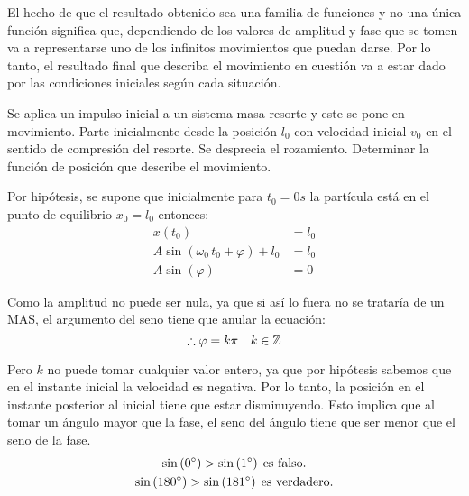 El hecho de que el resultado obtenido sea una familia de funciones y no una única función significa que, dependiendo de los valores de amplitud y fase que se tomen va a representarse uno de los infinitos movimientos que puedan darse.
Por lo tanto, el resultado final que describa el movimiento en cuestión va a estar dado por las condiciones iniciales según cada situación.

\begin{mdframed}[style=ExampleFrame]
    \begin{example}
    \end{example}
    \begin{formatI}
        Se aplica un impulso inicial a un sistema masa-resorte y este se pone en movimiento.
        Parte inicialmente desde la posición $l_0$ con velocidad inicial $v_0$ en el sentido de compresión del resorte.
        Se desprecia el rozamiento.
        Determinar la función de posición que describe el movimiento.
    \end{formatI}
    
    Por hipótesis, se supone que inicialmente para $t_0 = 0s$ la partícula está en el punto de equilibrio $x_0 = l_0$ entonces:
    \begin{align*}
        x(t_0) &= l_0
        \\
        A \sin{(\omega_0 \, t_0 + \varphi)} + l_0 &= l_0
        \\
        A \sin{(\varphi)} &= 0
    \end{align*}
    
    Como la amplitud no puede ser nula, ya que si así lo fuera no se trataría de un MAS, el argumento del seno tiene que anular la ecuación:
    \[ \therefore \varphi = k \pi \quad k \in \mathbb{Z} \]
    
    Pero $k$ no puede tomar cualquier valor entero, ya que por hipótesis sabemos que en el instante inicial la velocidad es negativa.
    Por lo tanto, la posición en el instante posterior al inicial tiene que estar disminuyendo.
    Esto implica que al tomar un ángulo mayor que la fase, el seno del ángulo tiene que ser menor que el seno de la fase.
    \begin{gather*}
        \sin{(0^{\circ})} > \sin{(1^{\circ})} \hspace{1ex} \text{es falso.}
        \\
        \sin{(180^{\circ})} > \sin{(181^{\circ})} \hspace{1ex} \text{es verdadero.}
    \end{gather*}
    

\end{mdframed}
